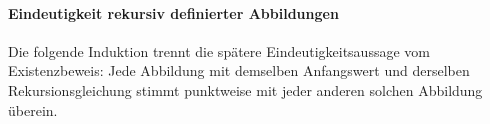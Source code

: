 \documentclass[main.tex]{subfiles}
\begin{document}
\paragraph{Eindeutigkeit rekursiv definierter Abbildungen}

Die folgende Induktion trennt die spätere Eindeutigkeitsaussage vom
Existenzbeweis: Jede Abbildung mit demselben Anfangswert und derselben
Rekursionsgleichung stimmt punktweise mit jeder anderen solchen Abbildung
überein.

\end{document}
